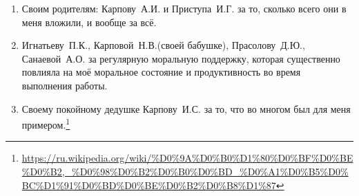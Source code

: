 \begin{enumerate}
\item Своим родителям: Карпову~А.\:И. и Приступа~И.\:Г. за то, сколько всего они в меня вложили, и вообще за всё.
\item Игнатьеву~П.\:К., Карповой~Н.\:В.(своей бабушке), Прасолову~Д.\:Ю., Санаевой~А.\:О. за регулярную моральную поддержку, которая существенно повлияла на моё моральное состояние и продуктивность во время выполнения работы.
\item Своему покойному дедушке Карпову~И.\:С. за то, что во многом был для меня примером.\footnote{\url{https://ru.wikipedia.org/wiki/\%D0\%9A\%D0\%B0\%D1\%80\%D0\%BF\%D0\%BE\%D0\%B2,_\%D0\%98\%D0\%B2\%D0\%B0\%D0\%BD_\%D0\%A1\%D0\%B5\%D0\%BC\%D1\%91\%D0\%BD\%D0\%BE\%D0\%B2\%D0\%B8\%D1\%87}}
\end{enumerate}


